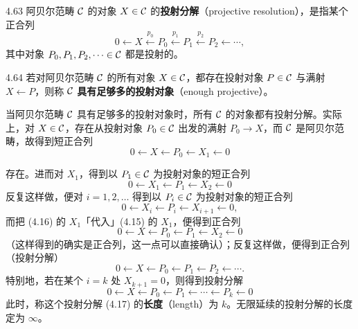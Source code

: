 \begin{definition}{4.63}
阿贝尔范畴 $\mathcal{C}$ 的对象 $X\in\mathcal{C}$ 的\textbf{投射分解}（projective resolution），是指某个正合列
\[ 0\leftarrow X\xleftarrow{\ p_0\ }P_0\xleftarrow{\ p_1\ }P_1\xleftarrow{\ p_2\ }P_2\leftarrow\cdots, \]
其中对象 $P_0,P_1,P_2,\dots\in\mathcal{C}$ 都是投射的。
\end{definition}

\begin{definition}{4.64}
若对阿贝尔范畴 $\mathcal{C}$ 的所有对象 $X\in\mathcal{C}$，都存在投射对象 $P\in\mathcal{C}$ 与满射 $X\leftarrow P$，则称 $\mathcal{C}$ \textbf{具有足够多的投射对象}（enough projective）。
\end{definition}

当阿贝尔范畴 $\mathcal{C}$ 具有足够多的投射对象时，所有 $\mathcal{C}$ 的对象都有投射分解。实际上，对 $X\in\mathcal{C}$，存在从投射对象 $P_0\in\mathcal{C}$ 出发的满射 $P_0\to X$，而 $\mathcal{C}$ 是阿贝尔范畴，故得到短正合列
\begin{equation}
  0\leftarrow X\leftarrow P_0\leftarrow X_1\leftarrow 0 \tag{4.15}
\end{equation}

存在。进而对 $X_1$，得到以 $P_1\in\mathcal{C}$ 为投射对象的短正合列
\begin{equation}
  0\leftarrow X_1\leftarrow P_1\leftarrow X_2\leftarrow 0 \tag{4.16}
\end{equation}
反复这样做，便对 $i=1,2,\dots$ 得到以 $P_i\in\mathcal{C}$ 为投射对象的短正合列
\[ 0\leftarrow X_i\leftarrow P_i\leftarrow X_{i+1}\leftarrow 0, \]
而把 (4.16) 的 $X_1$「代入」(4.15) 的 $X_1$，便得到正合列
\[ 0\leftarrow X\leftarrow P_0\leftarrow P_1\leftarrow X_2\leftarrow 0 \]
（这样得到的确实是正合列，这一点可以直接确认）；反复这样做，便得到正合列（投射分解）
\[ 0\leftarrow X\leftarrow P_0\leftarrow P_1\leftarrow P_2\leftarrow\cdots. \]
特别地，若在某个 $i=k$ 处 $X_{k+1}=0$，则得到投射分解
\begin{equation}
  0\leftarrow X\leftarrow P_0\leftarrow P_1\leftarrow\cdots\leftarrow P_k\leftarrow 0 \tag{4.17}
\end{equation}
此时，称这个投射分解 (4.17) 的\textbf{长度}（length）为 $k$。无限延续的投射分解的长度定为 $\infty$。

